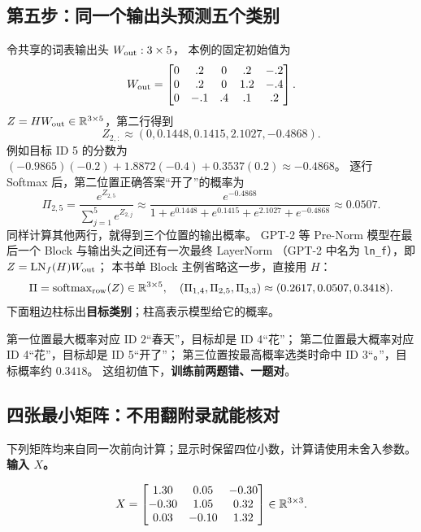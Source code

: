 \subsection{第五步：同一个输出头预测五个类别}
\label{partq:transformer}

令共享的词表输出头 $W_{\rm out}:3\times5$，
本例的固定初始值为
\[
W_{\rm out}=\begin{bmatrix}0&.2&0&.2&-.2\\0&.2&0&1.2&-.4\\0&-.1&.4&.1&.2\end{bmatrix}.
\]
$Z=HW_{\rm out}\in\mathbb{R}^{3\times5}$，第二行得到
\[
Z_{2,:}\approx(0,0.1448,0.1415,2.1027,-0.4868).
\]
例如目标 ID 5 的分数为
$(-0.9865)(-0.2)+1.8872(-0.4)+0.3537(0.2)\approx-0.4868$。
逐行 Softmax 后，第二位置正确答案“开了”的概率为
\[
\Pi_{2,5}=\frac{e^{Z_{2,5}}}{\sum_{j=1}^{5}e^{Z_{2,j}}}
\approx\frac{e^{-0.4868}}{1+e^{0.1448}+e^{0.1415}+e^{2.1027}+e^{-0.4868}}
\approx0.0507.
\]
同样计算其他两行，就得到三个位置的输出概率。
GPT-2 等 Pre-Norm 模型在最后一个 Block 与输出头之间还有一次最终 LayerNorm
（GPT-2 中名为 \texttt{ln\_f}），即 $Z=\operatorname{LN}_f(H)W_{\rm out}$；
本书单 Block 主例省略这一步，直接用 $H$：
\begin{equation}
\Pi=\operatorname{softmax}_{\rm row}(Z)\in\mathbb{R}^{3\times5},
\quad(\Pi_{1,4},\Pi_{2,5},\Pi_{3,3})
\approx(0.2617,0.0507,0.3418).
\label{eq:three-token-probabilities}
\end{equation}
下面粗边柱标出\textbf{目标类别}；柱高表示模型给它的概率。

\par\medskip


第一位置最大概率对应 ID 2“春天”，目标却是 ID 4“花”；
第二位置最大概率对应 ID 4“花”，目标却是 ID 5“开了”；
第三位置按最高概率选类时命中 ID 3“。”，目标概率约 $0.3418$。
这组初值下，\textbf{训练前两题错、一题对}。

\subsection*{四张最小矩阵：不用翻附录就能核对}
下列矩阵均来自同一次前向计算；显示时保留四位小数，计算请使用未舍入参数。
\noindent\textbf{输入 $X$。}\par
\begin{equation}
X=\begin{bmatrix}
1.30&0.05&-0.30\\
-0.30&1.05&0.32\\
0.03&-0.10&1.32
\end{bmatrix}\in\mathbb{R}^{3\times3}.
\end{equation}

